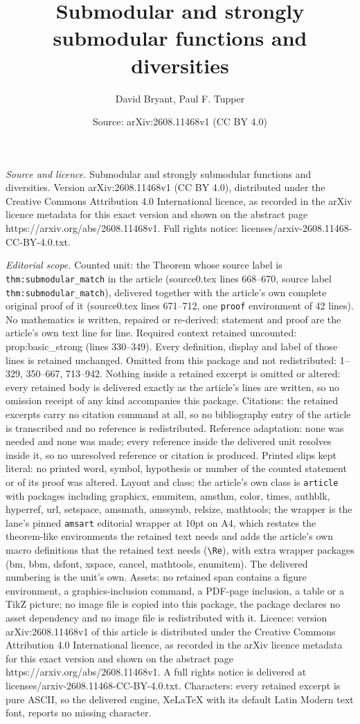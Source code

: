 \documentclass[10pt,a4paper]{amsart}
\title[Submodular and strongly submodular functions and diversities]{Submodular and strongly submodular functions and diversities}
\author{David Bryant, Paul F. Tupper}
\date{Source: arXiv:2608.11468v1 (CC BY 4.0)}
\begin{document}
\maketitle

\noindent\emph{Source and licence.} Submodular and strongly submodular functions and diversities. Version arXiv:2608.11468v1 (CC BY 4.0), distributed under the Creative Commons Attribution 4.0 International licence, as recorded in the arXiv licence metadata for this exact version and shown on the abstract page https://arxiv.org/abs/2608.11468v1. Full rights notice: licenses/arxiv-2608.11468-CC-BY-4.0.txt.\par\smallskip

\noindent\textit{Editorial scope.} Counted unit: the Theorem whose source label is \texttt{thm:submodular\_match} in the article (source0.tex lines 668--670, source label \texttt{thm:submodular\_match}), delivered together with the article's own complete original proof of it (source0.tex lines 671--712, one \texttt{proof} environment of 42 lines). No mathematics is written, repaired or re-derived: statement and proof are the article's own text line for line. Required context retained uncounted: prop:basic\_strong (lines 330--349). Every definition, display and label of those lines is retained unchanged. Omitted from this package and not redistributed: 1--329, 350--667, 713--942. Nothing inside a retained excerpt is omitted or altered: every retained body is delivered exactly as the article's lines are written, so no omission receipt of any kind accompanies this package. Citations: the retained excerpts carry no citation command at all, so no bibliography entry of the article is transcribed and no reference is redistributed. Reference adaptation: none was needed and none was made; every reference inside the delivered unit resolves inside it, so no unresolved reference or citation is produced. Printed slips kept literal: no printed word, symbol, hypothesis or number of the counted statement or of its proof was altered. Layout and class: the article's own class is \texttt{article} with packages including graphicx, enumitem, amsthm, color, times, authblk, hyperref, url, setspace, amsmath, amssymb, relsize, mathtools; the wrapper is the lane's pinned \texttt{amsart} editorial wrapper at 10pt on A4, which restates the theorem-like environments the retained text needs and adds the article's own macro definitions that the retained text needs (\texttt{\textbackslash Re}), with extra wrapper packages (bm, bbm, dsfont, xspace, cancel, mathtools, enumitem). The delivered numbering is the unit's own. Assets: no retained span contains a figure environment, a graphics-inclusion command, a PDF-page inclusion, a table or a TikZ picture; no image file is copied into this package, the package declares no asset dependency and no image file is redistributed with it. Licence: version arXiv:2608.11468v1 of this article is distributed under the Creative Commons Attribution 4.0 International licence, as recorded in the arXiv licence metadata for this exact version and shown on the abstract page https://arxiv.org/abs/2608.11468v1. A full rights notice is delivered at licenses/arxiv-2608.11468-CC-BY-4.0.txt. Characters: every retained excerpt is pure ASCII, so the delivered engine, XeLaTeX with its default Latin Modern text font, reports no missing character.
\end{document}
